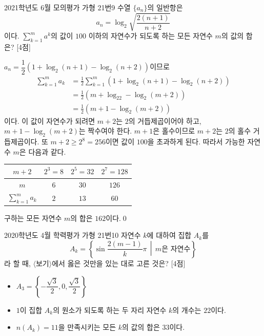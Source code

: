 \documentclass{article}
\begin{document}
\newpage
\begin{prob}{2021학년도 6월 모의평가 가형 21번}{9}
	수열 $\{a_n\}$의 일반항은
	\[
		a_n=\log_2\sqrt{\frac{2(n+1)}{n+2}}
	\]	
	이다. $\displaystyle\sum_{k=1}^ma^k$의 값이 $100$ 이하의 자연수가 되도록 하는 모든 자연수 $m$의 값의 합은? [4점]
\end{prob}

\begin{sol}
	$a_n=\dfrac{1}{2}(1+\log_2(n+1)-\log_2(n+2))$이므로
	\begin{align*}
		\sum_{k=1}^ma_k&=\frac{1}{2}\sum_{k=1}^m(1+\log_2(n+1)-\log_2(n+2))\\[3pt]
		&=\frac{1}{2}(m+\log_22-\log_2(m+2))\\[3pt]
		&=\frac{1}{2}(m+1-\log_2(m+2))
	\end{align*}
	이다. 이 값이 자연수가 되려면 $m+2$는 $2$의 거듭제곱이어야 하고, $m+1-\log_2(m+2)$는 짝수여야 한다. $m+1$은 홀수이므로 $m+2$는 $2$의 홀수 거듭제곱이다. 또 $m+2\geq 2^8=256$이면 값이 $100$을 초과하게 된다. 따라서 가능한 자연수 $m$은 다음과 같다.
	\begin{table}[H]
		\centering
		\begin{tabular}{c|ccc}
			\toprule
			$m+2$ & $2^3=8$ & $2^5=32$ & $2^7=128$ \\
			\midrule
			$m$ & $6$ & $30$ & $126$ \\
			\midrule
			$\sum_{k=1}^ma_k$ & $2$ & $13$ & $60$ \\
			\bottomrule
		\end{tabular}
	\end{table}
	구하는 모든 자연수 $m$의 합은 $162$이다.\qed
\end{sol}

\newpage
\begin{prob}{2020학년도 4월 학력평가 가형 21번}{10}
	자연수 $k$에 대하여 집합 $A_k$를
	\[
		A_k=\left\{\sin\frac{2(m-1)}{k}\pi\,\middle\vert\,m\text{은 자연수}\right\}
	\]
	라 할 때, $\langle$보기$\rangle$에서 옳은 것만을 있는 대로 고른 것은? [4점]
	\begin{hint}[보기]
		\begin{itemize}
			\item[ㄱ.] $A_3=\left\{-\dfrac{\sqrt3}{2},0,\dfrac{\sqrt3}{2}\right\}$
			\item[ㄴ.] $1$이 집합 $A_k$의 원소가 되도록 하는 두 자리 자연수 $k$의 개수는 $22$이다.
			\item[ㄷ.] $n(A_k)=11$을 만족시키는 모든 $k$의 값의 합은 $33$이다.
		\end{itemize}
	\end{hint}
\end{prob}
\end{document}

